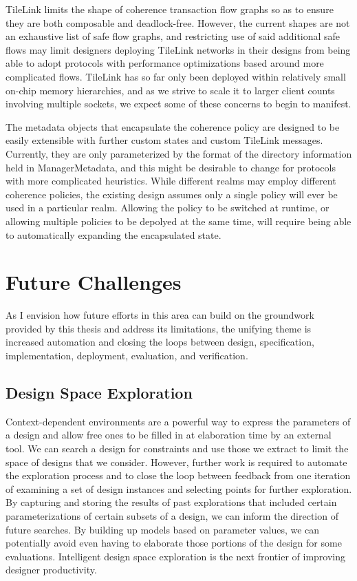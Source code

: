 TileLink limits the shape of coherence transaction flow graphs so as to ensure they are both composable and deadlock-free.
However, the current shapes are not an exhaustive list of safe flow graphs,
and restricting use of said additional safe flows may limit designers deploying TileLink networks in their designs
from being able to adopt protocols with performance optimizations based around more complicated flows.
TileLink has so far only been deployed within relatively small on-chip memory hierarchies,
and as we strive to scale it to larger client counts involving multiple sockets,
 we expect some of these concerns to begin to manifest. 

The metadata objects that encapsulate the coherence policy are designed to be easily extensible with
further custom states and custom TileLink messages.
Currently, they are only parameterized by the format of the directory information held in ManagerMetadata,
and this might be desirable to change for protocols with more complicated heuristics.
While different realms may employ different coherence policies,
the existing design assumes only a single policy will ever be used in a particular realm.
Allowing the policy to be switched at runtime, or allowing multiple policies to be depolyed at the same time,
will require being able to automatically expanding the encapsulated state.

\section{Future Challenges}

As I envision how future efforts in this area can build on the groundwork provided by this thesis and address its limitations,
the unifying theme is increased automation and closing the loops between
design, specification, implementation, deployment, evaluation, and verification.

\subsection{Design Space Exploration}

Context-dependent environments are a powerful way to express the parameters of a design and allow free ones
to be filled in at elaboration time by an external tool.
We can search a design for constraints and use those we extract to limit the space of designs that we consider.
However, further work is required to automate the exploration process and 
to close the loop between feedback from one iteration of examining a
set of design instances and selecting points for further exploration.
By capturing and storing the results of past explorations that included certain parameterizations
of certain subsets of a design, we can inform the direction of future searches.
By building up models based on parameter values, we can potentially avoid even having to elaborate those
portions of the design for some evaluations.
Intelligent design space exploration is the next frontier of improving designer productivity.

